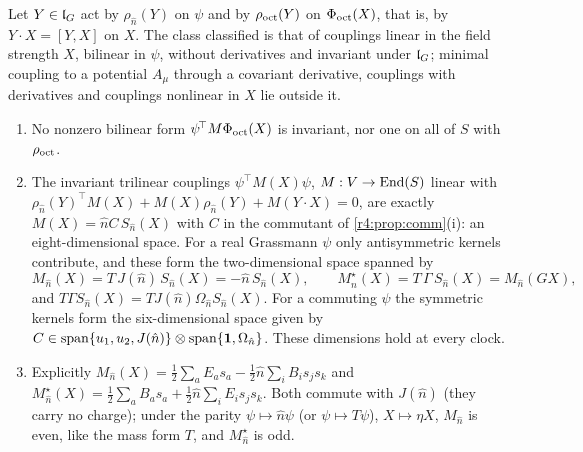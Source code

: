 \begin{theorem}
\label{r4:thm:couplings}
Let $Y\in\mathfrak l_G$ act by $\rho_{\hat n}(Y)$ on $\psi$ and by $\rho_{\rm oct}(Y)$ on $\Phi_{\rm oct}(X)$, that is, by $Y\cdot X=[Y,X]$ on $X$. The class classified is that of
couplings linear in the field strength $X$, bilinear in $\psi$, without derivatives and invariant under $\mathfrak l_G$; minimal coupling to a potential
$A_\mu$ through a covariant derivative, couplings with derivatives and couplings nonlinear in $X$ lie outside it.
\begin{enumerate}[label=(\roman*),leftmargin=2.2em]
\item No nonzero bilinear form $\psi^{\!\top}M\Phi_{\rm oct}(X)$ is invariant, nor one on all of $S$ with $\rho_{\rm oct}$.
\item The invariant trilinear couplings $\psi^{\!\top}M(X)\psi$, $M:V\to\operatorname{End}(S)$ linear with $\rho_{\hat n}(Y)^{\!\top}M(X)+M(X)\rho_{\hat n}(Y)+M(Y\cdot X)=0$, are exactly
$M(X)=\hat nC\,S_{\hat n}(X)$ with $C$ in the commutant of \cref{r4:prop:comm}(i): an eight-dimensional space. For a real Grassmann $\psi$ only antisymmetric
kernels contribute, and these form the two-dimensional space spanned by
\[
M_{\hat n}(X)=T\,J(\hat n)\,S_{\hat n}(X)=-\hat n\,S_{\hat n}(X),\qquad M^\star_{\hat n}(X)=T\,\Gamma\,S_{\hat n}(X)=M_{\hat n}(GX),
\]
and $T\Gamma S_{\hat n}(X)=TJ(\hat n)\Omega_{\hat n}S_{\hat n}(X)$.
For a commuting $\psi$ the symmetric kernels form the six-dimensional space given by
$C\in\operatorname{span}\{u_1,u_2,J(\hat n)\}\otimes\operatorname{span}\{\mathbf 1,\Omega_{\hat n}\}$. These dimensions hold at every clock.
\item Explicitly $M_{\hat n}(X)=\tfrac12\sum_aE_as_a-\tfrac12\hat n\sum_iB_is_js_k$ and $M^\star_{\hat n}(X)=\tfrac12\sum_aB_as_a+\tfrac12\hat n\sum_iE_is_js_k$. Both commute with $J(\hat n)$ (they carry no
charge); under the parity $\psi\mapsto \hat n\psi$ (or $\psi\mapsto T\psi$), $X\mapsto\eta X$, $M_{\hat n}$ is even, like the mass form $T$, and $M^\star_{\hat n}$ is odd.
\end{enumerate}
\end{theorem}

